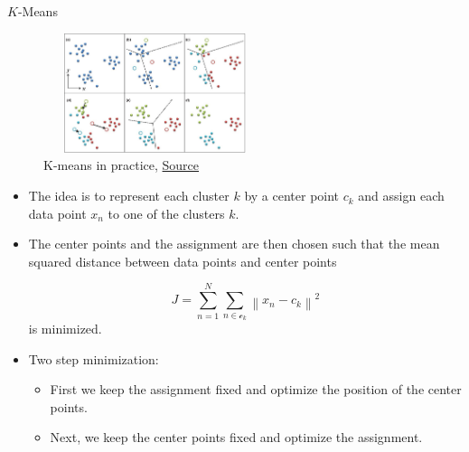 \documentclass[compress,oilve]{beamer}
\begin{document}

\begin{frame}{$K$-Means}
		
	\begin{figure}[H]
		\includegraphics[width=6.5cm, height=3.5cm]{Figs/4.png}
		\caption{K-means in practice, \href{	https://tinyurl.com/2q6ec2c6}{Source}}
	\end{figure}
	
	\begin{itemize}
		
		\item The idea is to represent each cluster $k$ by a center point $c_k$ and assign each data point $x_n$ to one of the clusters $k$.
		
		\medskip
		\item The center points and the assignment are then chosen such that the mean squared distance between data points and center points
		
		\begin{equation*}
			J=\sum_{n=1}^N \sum_{n\in\mathcal{c}_k} \left\|x_n-c_k\right\|^2
		\end{equation*}
	is minimized.
	
	\item Two step minimization:
	\begin{itemize}
		\item First we keep the assignment fixed and optimize the position of the center points.
		\item Next, we keep the center points fixed and optimize the
		assignment.
		
	\end{itemize}
	\end{itemize}
\end{frame}
\end{document}
